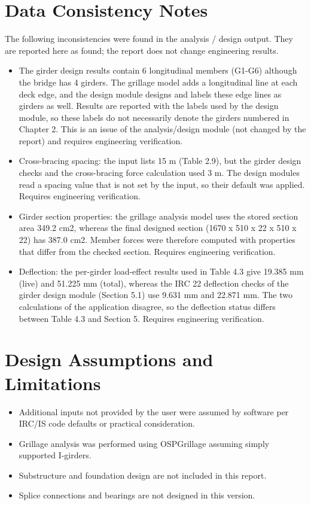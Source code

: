 \documentclass[12pt,a4paper]{report}
\numberwithin{table}{chapter}
\numberwithin{figure}{chapter}
\begin{document}
\section*{Data Consistency Notes}
The following inconsistencies were found in the analysis / design output. They are reported here as found; the report does not change engineering results.
\begin{itemize}
\item The girder design results contain 6 longitudinal members (G1-G6) although the bridge has 4 girders. The grillage model adds a longitudinal line at each deck edge, and the design module designs and labels these edge lines as girders as well. Results are reported with the labels used by the design module, so these labels do not necessarily denote the girders numbered in Chapter 2. This is an issue of the analysis/design module (not changed by the report) and requires engineering verification.
\item Cross-bracing spacing:\allowbreak{} the input lists 15 m (Table 2.9), but the girder design checks and the cross-bracing force calculation used 3 m. The design modules read a spacing value that is not set by the input, so their default was applied. Requires engineering verification.
\item Girder section properties:\allowbreak{} the grillage analysis model uses the stored section area 349.2 cm2, whereas the final designed section (1670 x 510 x 22 x 510 x 22) has 387.0 cm2. Member forces were therefore computed with properties that differ from the checked section. Requires engineering verification.
\item Deflection:\allowbreak{} the per-girder load-effect results used in Table 4.3 give 19.385 mm (live) and 51.225 mm (total), whereas the IRC 22 deflection checks of the girder design module (Section 5.1) use 9.631 mm and 22.871 mm. The two calculations of the application disagree, so the deflection status differs between Table 4.3 and Section 5. Requires engineering verification.
\end{itemize}

\section*{Design Assumptions and Limitations}
\label{sec:assumptions}

\begin{itemize}
\item Additional inputs not provided by the user were assumed by software per IRC/IS code defaults or practical consideration.
\item Grillage analysis was performed using OSPGrillage assuming simply supported I-girders.
\item Substructure and foundation design are not included in this report.
\item Splice connections and bearings are not designed in this version.
\end{itemize}
\end{document}
